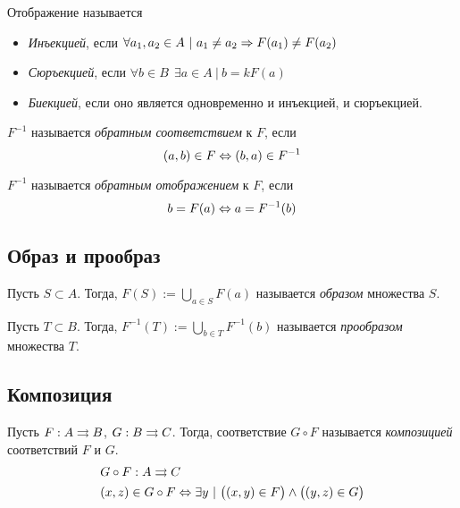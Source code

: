 Отображение называется
\begin{itemize}
	\item \textit{Инъекцией}, если $\forall a_1, a_2 \in A\ |\ a_1 \neq a_2 \Rightarrow F(a_1) \neq F(a_2)$
	\item \textit{Сюръекцией}, если $\forall b \in B\ \ \exists a \in A\ |\ b =k F(a)$
	\item \textit{Биекцией}, если оно является одновременно и инъекцией, и сюръекцией.
\end{itemize}

\begin{definition}
	$F^{-1}$ называется \textit{обратным соответствием} к $F$, если
	$$
		(a, b) \in F \Leftrightarrow (b, a) \in F^{-1}
	$$
\end{definition}

\begin{definition}
		$F^{-1}$ называется \textit{обратным отображением} к $F$, если
	$$
		b = F(a) \Leftrightarrow a = F^{-1}(b)
	$$
\end{definition}

\subsection{Образ и прообраз}

\begin{definition}
	Пусть $S \subset A$. Тогда, $F(S) := \bigcup\limits_{a \in S} F(a)$ называется \textit{образом} множества $S$.
\end{definition}

\begin{definition}
	Пусть $T \subset B$. Тогда, $F^{-1}(T) := \bigcup\limits_{b \in T} F^{-1}(b)$ называется \textit{прообразом} множества $T$.
\end{definition}

\subsection{Композиция}

\begin{definition}
	Пусть $F : A \rightrightarrows B$, $G : B \rightrightarrows C$. Тогда, соответствие $G \circ F$ называется \textit{композицией} соответствий $F$ и $G$.
	\begin{align*}
		&G \circ F : A \rightrightarrows C
		\\
		&(x, z) \in G \circ F \Leftrightarrow \exists y\ |\ \big((x, y) \in F\big) \wedge \big((y, z) \in G\big)
	\end{align*}
\end{definition}

